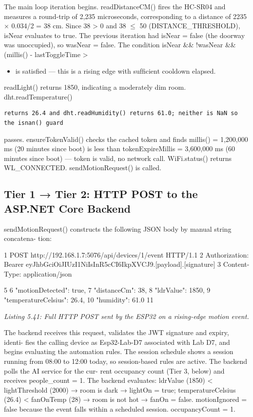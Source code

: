 The main loop iteration begins. readDistanceCM() ﬁres the HC-SR04 and measures
a round-trip of 2,235 microseconds, corresponding to a distance of 2235 × 0.034/2 =
38 cm. Since 38 > 0 and 38 $\le$ 50 (DISTANCE\_THRESHOLD), isNear evaluates to true.
The previous iteration had isNear = false (the doorway was unoccupied), so wasNear
= false. The condition isNear \&\& !wasNear \&\& (millis() - lastToggleTime >
\begin{itemize}
  \item is satisﬁed --- this is a rising edge with sufﬁcient cooldown elapsed.
\end{itemize}

readLight() returns 1850, indicating a moderately dim room. dht.readTemperature()
\begin{lstlisting}
returns 26.4 and dht.readHumidity() returns 61.0; neither is NaN so the isnan() guard
\end{lstlisting}

passes. ensureTokenValid() checks the cached token and ﬁnds millis() = 1,200,000 ms
(20 minutes since boot) is less than tokenExpireMillis = 3,600,000 ms (60 minutes
since boot) --- token is valid, no network call. WiFi.status() returns WL\_CONNECTED.
sendMotionRequest() is called.







\subsection{Tier 1 → Tier 2: HTTP POST to the ASP.NET Core Backend}


sendMotionRequest() constructs the following JSON body by manual string concatena-
tion:

1 POST http://192.168.1.7:5076/api/devices/1/event HTTP/1.1
2 Authorization: Bearer eyJhbGciOiJIUzI1NiIsInR5cCI6IkpXVCJ9.[payload].[signature]
3 Content-Type: application/json

5 {
6 "motionDetected": true,
7 "distanceCm": 38,
8 "ldrValue": 1850,
9 "temperatureCelsius": 26.4,
10 "humidity": 61.0
11 }



\textit{Listing 5.41: Full HTTP POST sent by the ESP32 on a rising-edge motion event.}



The backend receives this request, validates the JWT signature and expiry, identi-
ﬁes the calling device as Esp32-Lab-D7 associated with Lab D7, and begins evaluating
the automation rules. The session schedule shows a session running from 08:00 to 12:00
today, so session-based rules are active. The backend polls the AI service for the cur-
rent occupancy count (Tier 3, below) and receives people\_count = 1. The backend
evaluates: ldrValue (1850) < lightThreshold (2000) → room is dark → lightOn
= true; temperatureCelsius (26.4) < fanOnTemp (28) → room is not hot → fanOn
= false. motionIgnored = false because the event falls within a scheduled session.
occupancyCount = 1.



